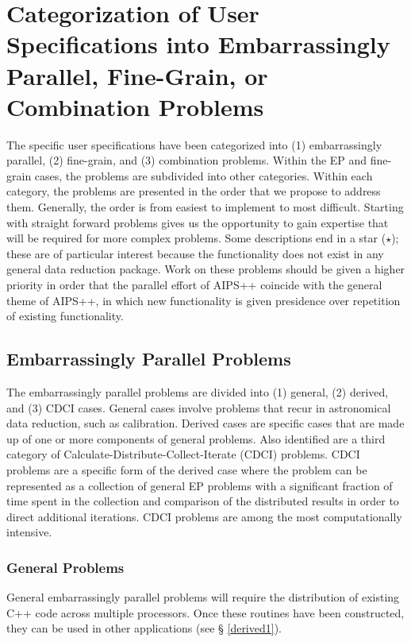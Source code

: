 \section{Categorization of User Specifications into Embarrassingly
Parallel, Fine-Grain, or Combination Problems}

The specific user specifications have been categorized into (1)
embarrassingly parallel, (2) fine-grain, and (3) combination problems.
Within the EP and fine-grain cases, the problems are subdivided into
other categories.  Within each category, the problems are presented in
the order that we propose to address them.  Generally, the order is
from easiest to implement to most difficult.  Starting with straight
forward problems gives us the opportunity to gain expertise that will
be required for more complex problems.  Some descriptions end in a
star ($\star$); these are of particular interest because the
functionality does not exist in any general data reduction package.
Work on these problems should be given a higher priority in order that
the parallel effort of AIPS++ coincide with the general theme of
AIPS++, in which new functionality is given presidence over repetition
of existing functionality.

\subsection{Embarrassingly Parallel Problems}

The embarrassingly parallel problems are divided into (1) general, (2)
derived, and (3) CDCI cases.  General cases involve problems that
recur in astronomical data reduction, such as calibration.  Derived
cases are specific cases that are made up of one or more components of
general problems.  Also identified are a third category of
Calculate-Distribute-Collect-Iterate (CDCI) problems.  CDCI problems
are a specific form of the derived case where the problem can be
represented as a collection of general EP problems with a significant
fraction of time spent in the collection and comparison of the
distributed results in order to direct additional iterations.  CDCI
problems are among the most computationally intensive.

\subsubsection{General Problems}

General embarrassingly parallel problems will require the distribution
of existing C++ code across multiple processors.  Once these routines
have been constructed, they can be used in other applications (see \S
\ref{derived1}).  

